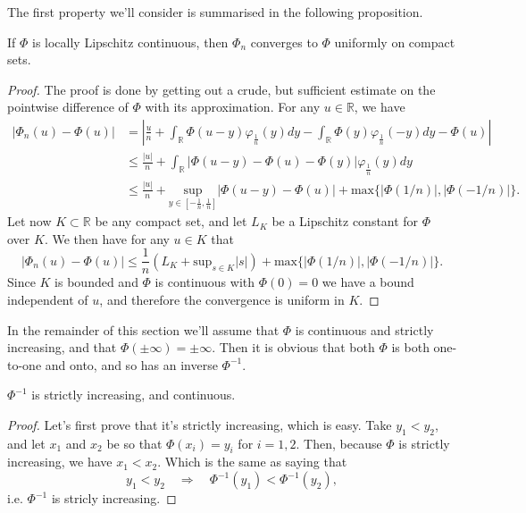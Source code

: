 \documentclass[11pt, a4paper]{article}
\begin{document}
\begin{appendix}
The first property we'll consider is summarised in the following proposition.
\begin{proposition}
If $\Phi$ is locally Lipschitz continuous, then $\Phi_n$ converges to $\Phi$ uniformly on compact sets.
\end{proposition}
\begin{proof}
The proof is done by getting out a crude, but sufficient estimate on the pointwise difference of $\Phi$ with its approximation. For any $u \in \mathbb{R}$, we have
\begin{align*}
|\Phi_n(u) - \Phi(u)| &= \left| \frac{u}{n} + \int_\mathbb{R}\Phi(u-y)\varphi_{\frac{1}{n}}(y)dy - \int_\mathbb{R}\Phi(y)\varphi_{\frac{1}{n}}(-y)dy - \Phi(u)\right| \\
& \leq \frac{|u|}{n} + \int_\mathbb{R}\left| \Phi(u-y) - \Phi(u) - \Phi(y)\right| \varphi_{\frac{1}{n}}(y) dy \\
& \leq \frac{|u|}{n} + \underset{y\in[-\frac{1}{n},\frac{1}{n}]}{\mathrm{sup}}|\Phi(u-y) - \Phi(u)| + \mathrm{max}\{|\Phi (1/n) |,|\Phi(-1/n)| \}.
\end{align*}
Let now $K \subset \mathbb{R}$ be any compact set, and let $L_K$ be a Lipschitz constant for $\Phi$ over $K$. We then have for any $u \in K$ that
\begin{equation*}
|\Phi_n(u) - \Phi(u)| \leq \frac{1}{n}\left( L_K + \mathrm{sup}_{s \in K}|s| \right) + \mathrm{max}\{|\Phi (1/n) |,|\Phi(-1/n)| \}.
\end{equation*}
Since $K$ is bounded and $\Phi$ is continuous with $\Phi(0) = 0$ we have a bound independent of $u$, and therefore the convergence is uniform in $K$.
\end{proof}


In the remainder of this section we'll assume that $\Phi$ is continuous and strictly increasing, and that $\Phi( \pm \infty) = \pm \infty$. Then it is obvious that both $\Phi$ is both one-to-one and onto, and so has an inverse $\Phi^{-1}$.

\begin{proposition}
$\Phi^{-1}$ is strictly increasing, and continuous.
\end{proposition}
\begin{proof}
Let's first prove that it's strictly increasing, which is easy. Take $y_1 < y_2$, and let $x_1$ and $x_2$ be so that $\Phi(x_i) = y_i$ for $i=1,2$. Then, because $\Phi$ is strictly increasing, we have $x_1 < x_2$. Which is the same as saying that
\begin{equation*}
y_1 < y_2 \quad \Rightarrow \quad \Phi^{-1}(y_1) < \Phi^{-1}(y_2),
\end{equation*}
i.e. $\Phi^{-1}$ is stricly increasing.


\end{proof}
\end{appendix}
\end{document}
